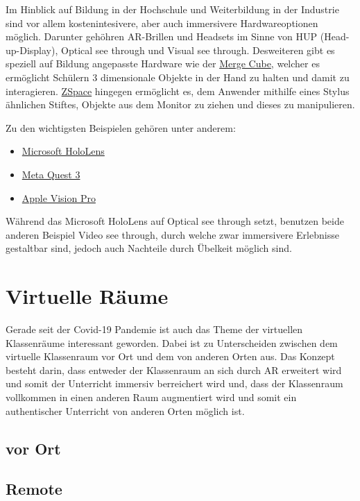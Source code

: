 \documentclass[conference]{IEEEtran}
\begin{document}
Im Hinblick auf Bildung in der Hochschule und Weiterbildung in der Industrie sind vor allem kostenintesivere,
aber auch immersivere Hardwareoptionen möglich. Darunter gehöhren AR-Brillen und Headsets im Sinne von HUP (Head-up-Display),
Optical see through und Visual see through. Desweiteren gibt es speziell auf Bildung angepasste Hardware wie der 
\href{https://mergeedu.com/cube?cr=4646}{Merge Cube}, welcher es ermöglicht Schülern 3 dimensionale Objekte in der Hand zu
halten und damit zu interagieren. \href{https://zspace.com/}{ZSpace} hingegen ermöglicht es, dem Anwender mithilfe eines Stylus 
ähnlichen Stiftes, Objekte aus dem Monitor zu ziehen und dieses zu manipulieren.

Zu den wichtigsten Beispielen gehören unter anderem:
\begin{itemize}
    \item \href{https://www.microsoft.com/de-de/hololens}{Microsoft HoloLens}
    \item \href{https://www.meta.com/de/quest/quest-3/}{Meta Quest 3}
    \item \href{https://www.apple.com/de/apple-vision-pro/}{Apple Vision Pro}
\end{itemize}

Während das Microsoft HoloLens auf Optical see through setzt, benutzen beide anderen Beispiel Video see through, durch welche
zwar immersivere Erlebnisse gestaltbar sind, jedoch auch Nachteile durch Übelkeit möglich sind.


\section{Virtuelle Räume}
Gerade seit der Covid-19 Pandemie ist auch das Theme der virtuellen Klassenräume interessant geworden.
Dabei ist zu Unterscheiden zwischen dem virtuelle Klassenraum vor Ort und dem von anderen Orten aus.
Das Konzept besteht darin, dass entweder der Klassenraum an sich durch AR erweitert wird und somit der Unterricht
immersiv berreichert wird und, dass der Klassenraum vollkommen in einen anderen Raum augmentiert wird und somit
ein authentischer Unterricht von anderen Orten möglich ist.

\subsection{vor Ort}


\subsection{Remote}
\end{document}
